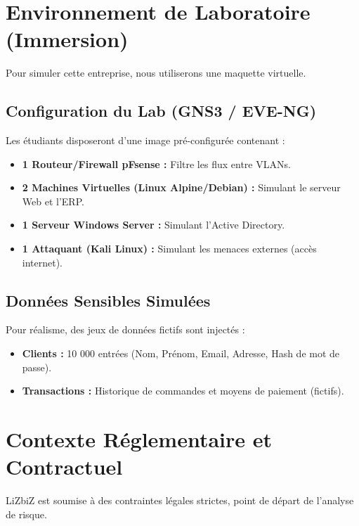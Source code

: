\section{Environnement de Laboratoire (Immersion)}

Pour simuler cette entreprise, nous utiliserons une maquette virtuelle.

\subsection{Configuration du Lab (GNS3 / EVE-NG)}
Les étudiants disposeront d'une image pré-configurée contenant :
\begin{itemize}
    \item \textbf{1 Routeur/Firewall pFsense :} Filtre les flux entre VLANs.
    \item \textbf{2 Machines Virtuelles (Linux Alpine/Debian) :} Simulant le serveur Web et l'ERP.
    \item \textbf{1 Serveur Windows Server :} Simulant l'Active Directory.
    \item \textbf{1 Attaquant (Kali Linux) :} Simulant les menaces externes (accès internet).
\end{itemize}

\subsection{Données Sensibles Simulées}
Pour réalisme, des jeux de données fictifs sont injectés :
\begin{itemize}
    \item \textbf{Clients :} 10 000 entrées (Nom, Prénom, Email, Adresse, Hash de mot de passe).
    \item \textbf{Transactions :} Historique de commandes et moyens de paiement (fictifs).
\end{itemize}

\section{Contexte Réglementaire et Contractuel}

LiZbiZ est soumise à des contraintes légales strictes, point de départ de l'analyse de risque.

